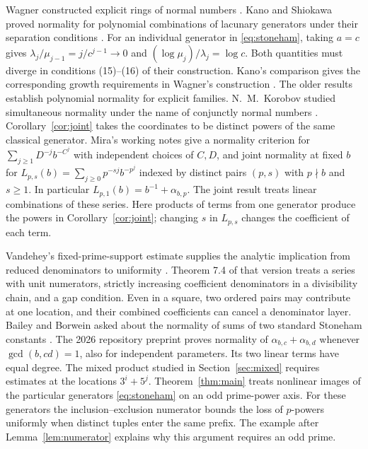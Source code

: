 \documentclass[11pt]{article}
\begin{document}
Wagner constructed explicit rings of normal numbers \cite{wagner}.
Kano and Shiokawa proved normality for polynomial combinations of lacunary
generators under their separation conditions \cite[Theorems 4--5]{ks}.
For an individual generator in \eqref{eq:stoneham}, taking $a=c$ gives
$\lambda_j/\mu_{j-1}=j/c^{j-1}\to0$ and $(\log\mu_j)/\lambda_j=\log c$.
Both quantities must diverge in conditions (15)--(16) of their construction.
Kano's comparison gives the corresponding growth requirements in Wagner's construction
\cite[pp.~909--911]{kano}. The older results establish polynomial normality for
explicit families. N.~M.~Korobov studied simultaneous normality under the name of conjunctly
normal numbers \cite{jointkorobov}. Corollary~\ref{cor:joint} takes the coordinates to be
distinct powers of the same classical generator. Mira's working notes \cite[S07, Thm.~1; S09, Thm.~2]{mira} give a normality criterion for $\sum_{j\ge1}D^{-j}b^{-C^j}$ with independent choices of $C,D$, and joint normality at fixed $b$ for $L_{p,s}(b)=\sum_{j\ge0}p^{-sj}b^{-p^j}$ indexed by distinct pairs $(p,s)$ with $p\nmid b$ and $s\ge1$. In particular $L_{p,1}(b)=b^{-1}+\alpha_{b,p}$. The joint result treats linear combinations of these series. Here products of terms from one generator produce the powers in Corollary~\ref{cor:joint}; changing $s$ in $L_{p,s}$ changes the coefficient of each term.

Vandehey's fixed-prime-support estimate supplies the analytic implication from reduced
denominators to uniformity \cite[Corollary 1.2 in the preprint]{vandehey}. Theorem 7.4 of that version treats a series
with unit numerators, strictly increasing coefficient denominators in a divisibility chain,
and a gap condition. Even in a square, two ordered pairs may contribute at one location,
and their combined coefficients can cancel a denominator layer.
Bailey and Borwein asked about the normality of sums of two standard Stoneham constants \cite[\S4]{bb}.
The 2026 repository preprint \cite{twosum} proves normality of
$\alpha_{b,c}+\alpha_{b,d}$ whenever $\gcd(b,cd)=1$, also for independent parameters.
Its two linear terms have equal degree. The mixed product studied in
Section~\ref{sec:mixed} requires estimates at the locations $3^i+5^j$.
Theorem~\ref{thm:main} treats nonlinear images of the particular generators
\eqref{eq:stoneham} on an odd prime-power axis. For these generators the inclusion--exclusion numerator bounds the loss of
$p$-powers uniformly when distinct tuples enter the same prefix. The example after
Lemma~\ref{lem:numerator} explains why this argument requires an odd prime.
\end{document}
